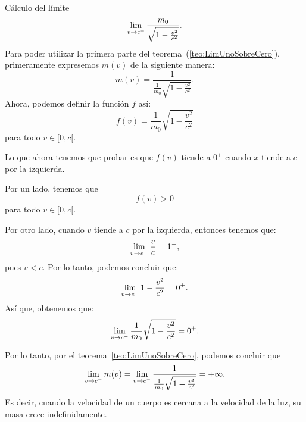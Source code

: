 \begin{exemplo}[Solución]{%
Cálculo del límite
\[
\limjc{\frac{m_0}{\sqrt{1 - \frac{v^2}{c^2}}}}{v}{c^-}.
\]}%
Para poder utilizar la primera parte del teorema~(\ref{teo:LimUnoSobreCero}), primeramente
expresemos $m(v)$ de la siguiente manera:
\[
m(v) = \frac{1}{\frac{1}{m_0}\sqrt{1 - \frac{v^2}{c^2}}}.
\]
Ahora, podemos definir la función $f$ así:
\[
f(v) = \frac{1}{m_0}\sqrt{1 - \frac{v^2}{c^2}}
\]
para todo $v \in [0,c[$.

Lo que ahora tenemos que probar es que $f(v)$ tiende a $0^+$ cuando $x$ tiende a $c$ por la
izquierda.

Por un lado, tenemos que
\[
f(v) > 0
\]
para todo $v \in [0,c[$.

Por otro lado, cuando $v$ tiende a $c$ por la izquierda, entonces tenemos que:
\[
\limjc{\frac{v}{c}}{v}{c^-} = 1^-,
\]
pues $v < c$. Por lo tanto, podemos concluir que:
\[
\limjc{1 - \frac{v^2}{c^2}}{v}{c^-} = 0^+.
\]
Así que, obtenemos que:
\[
\limjc{\frac{1}{m_0}\sqrt{1 - \frac{v^2}{c^2}}}{v}{c^-} = 0^+.
\]

Por lo tanto, por el teorema~\ref{teo:LimUnoSobreCero}, podemos concluir que
\[
\limjc{m(v)}{v}{c^-} =\limjc{\frac{1}{\frac{1}{m_0}\sqrt{1 - \frac{v^2}{c^2}}}}{v}{c^-} =
+\infty.
\]
Es decir, cuando la velocidad de un cuerpo es cercana a la velocidad de la luz, su masa crece
indefinidamente.
\end{exemplo}

